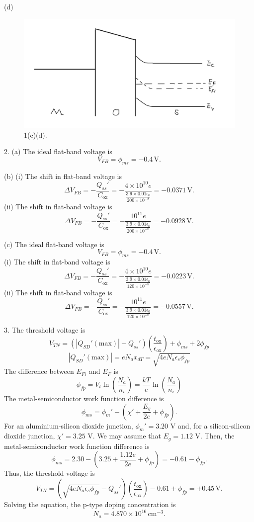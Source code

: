 \documentclass[a4paper]{article}
\begin{document}
(d)
\begin{figure}[H]
    \centering
    \includegraphics[width=1\textwidth]{4.png}
    \caption{1(c)(d).}
\end{figure}

2. (a) The ideal flat-band voltage is
\[V_{FB}=\phi_{ms}=-0.4\,\text{V}.\]

(b) (i) The shift in flat-band voltage is
\[\Delta V_{FB}=-\frac{Q_{ss}'}{C_\text{ox}}=-\frac{4\times10^{10}e}{\frac{3.9\times0.01\epsilon_0}{200\times10^{-8}}}=-0.0371\,\text{V}.\]
(ii) The shift in flat-band voltage is
\[\Delta V_{FB}=-\frac{Q_{ss}'}{C_\text{ox}}=-\frac{10^{11}e}{\frac{3.9\times0.01\epsilon_0}{200\times10^{-8}}}=-0.0928\,\text{V}.\]

(c) The ideal flat-band voltage is
\[V_{FB}=\phi_{ms}=-0.4\,\text{V}.\]
(i) The shift in flat-band voltage is
\[\Delta V_{FB}=-\frac{Q_{ss}'}{C_\text{ox}}=-\frac{4\times10^{10}e}{\frac{3.9\times0.01\epsilon_0}{120\times10^{-8}}}=-0.0223\,\text{V}.\]
(ii) The shift in flat-band voltage is
\[\Delta V_{FB}=-\frac{Q_{ss}'}{C_\text{ox}}=-\frac{10^{11}e}{\frac{3.9\times0.01\epsilon_0}{120\times10^{-8}}}=-0.0557\,\text{V}.\]

3. The threshold voltage is
\[V_{TN}=(|Q_{SD}'(\text{max})|-Q_{ss}')\left(\frac{t_\text{ox}}{\epsilon_\text{ox}}\right)+\phi_{ms}+2\phi_{fp}\]
\[|Q_{SD}'(\text{max})|=eN_ax_{dT}=\sqrt{4eN_a\epsilon_s\phi_{fp}}\]
The difference between $E_{Fi}$ and $E_F$ is
\[\phi_{fp}=V_t\ln{\left(\frac{N_a}{n_i}\right)}=\frac{kT}{e}\ln{\left(\frac{N_a}{n_i}\right)}\]
The metal-semiconductor work function difference is
\[\phi_{ms}=\phi_m'-\left(\chi'+\frac{E_g}{2e}+\phi_{fp}\right).\]
For an aluminium-silicon dioxide junction, $\phi_m'=3.20$ V and, for a silicon-silicon dioxide junction, $\chi'=3.25$ V. We may assume that $E_g=1.12$ V. Then, the metal-semiconductor work function difference is
\[\phi_{ms}=2.30-\left(3.25+\frac{1.12e}{2e}+\phi_{fp}\right)=-0.61-\phi_{fp}.\]
Thus, the threshold voltage is
\[V_{TN}=(\sqrt{4eN_a\epsilon_s\phi_{fp}}-Q_{ss}')\left(\frac{t_\text{ox}}{\epsilon_\text{ox}}\right)-0.61+\phi_{fp}=+0.45\,\text{V}.\]
Solving the equation, the p-type doping concentration is
\[N_a=4.870\times10^{16}\,\mathrm{cm^{-3}}.\]
\end{document}
